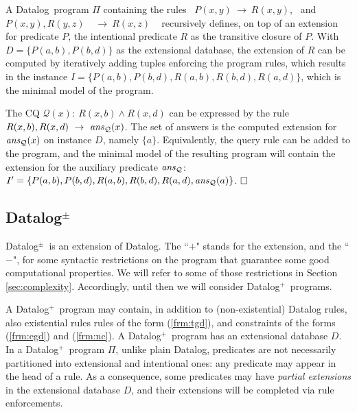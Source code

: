 \documentclass[format=acmsmall, review=false, screen=true]{acmart}
\newcommand{\ignore}[1]{}
\newcommand{\boxtheorem}{\ensuremath{\hfill \Box}}
\newcommand{\mc}[1]{\mathcal{ #1}}
\newcommand{\nit}[1]{{\it #1}}
\newcommand{\da}{Datalog}
\newcommand{\dpm}{{Datalog}$^\pm$}
\newcommand{\prg}{\Pi}
\newcommand{\dplus}{{Datalog}$^+$}
\newcommand{\owa}{OWA}
\newcommand{\cwa}{CWA}
\newcommand{\red}[1]{{#1}}
\newcommand{\blue}[1]{{#1}}
\newcommand{\comlb}[1]{{\vspace{2mm}\noindent \bf \blue{COMM(LEO):}}~ #1 \hfill {\bf
    END.}\\}
\newcommand{\commos}[1]{{\vspace{2mm}\noindent \bf \blue{COMM(MOSTAFA):}}~ #1 \hfill {\bf
    END.}\\}
\begin{document}
\begin{example} \label{ex:datalog} A \da \ program $\prg$ containing the rules \ $P(x,y)~\rightarrow~R(x,y)$, \ and \
$P(x,y),R(y,z)$ \ $~\rightarrow~R(x,z)$ \
\ignore{
\vspace{-3mm}
\begin{align*}
P(x,y)~\rightarrow~R(x,y),\\
P(x,y),R(y,z)~\rightarrow~R(x,z),
\end{align*}
\vspace{-3mm} }
recursively defines, \red{on top of an extension for predicate $P$,} the intentional predicate $R$ as the transitive closure of  $P$. With $D=\{P(a,b),P(b,d)\}$ as the extensional database, the extension of $R$ can be computed by iteratively adding tuples enforcing the program rules, which results in the \red{ instance $I=\{P(a,b),P(b,d),R(a,b),R(b,d),R(a,d)\}$, which is the minimal model of the program}.

The CQ $\mc{Q}(x)\!: \ R(x,b) \wedge R(x,d)$ can be expressed by the rule \ $R(x,b), R(x,d) \ \rightarrow \ \nit{ans}_{\mc{Q}}(x)$. \red{The set of answers is the computed extension for $\nit{ans}_{\mc{Q}}(x)$ \red{on instance $D$}, namely $\{a\}$. Equivalently, the query rule can be added to the program, and the minimal model of the resulting program will contain the extension for the auxiliary predicate $\nit{ans}_{\mc{Q}}$: $I'=\{P(a,b),P(b,d),R(a,b),R(b,d),R(a,d),\nit{ans}_{\mc{Q}}(a)\}$.}
\boxtheorem
\end{example}


\subsection{Datalog$^\pm$}\label{sec:dpm}


\dpm \ is an extension of Datalog. The ``$+$" stands for the extension, and the ``$-$", for some syntactic restrictions on the program that guarantee some good computational properties. We will refer to some of those restrictions in Section \ref{sec:complexity}. Accordingly, until then we will consider \dplus \ programs.

A \dplus \ program may contain, in addition to (non-existential) Datalog rules, also existential rules rules of the form (\ref{frm:tgd}), and constraints of the forms (\ref{frm:egd}) and (\ref{frm:nc}). A \dplus \ program has an extensional database $D$. \red{In a \dplus \ program $\Pi$, unlike plain Datalog, predicates are not necessarily partitioned into extensional and intentional ones: any predicate may appear in the head of a rule. As a consequence, some predicates may have {\em partial extensions} in the extensional database $D$, and their extensions will  be completed via rule enforcements. \ignore{A predicate $P$ has a partial extension in $D$ if there is a model $I$ of $\Pi$ in which $P(I)\neq P(D)$.}}%
\end{document}
